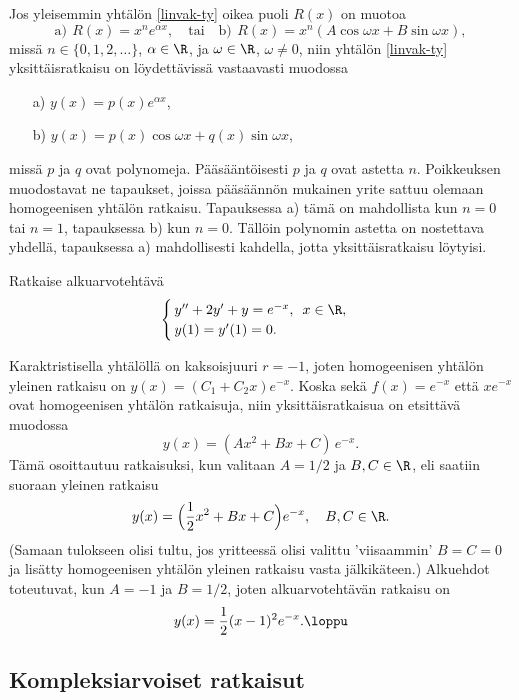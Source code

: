 Jos yleisemmin yhtälön \eqref{linvak-ty} oikea puoli $R(x)$ on muotoa
\[
\text{a)} \ \, R(x)=x^ne^{\alpha x}, \quad \text{tai} \quad 
\text{b)} \ \, R(x)=x^n(A\cos\omega x + B\sin\omega x),
\]
missä $n\in \{0,1,2,\ldots\}$, $\alpha\in\R$, ja $\omega\in\R$, $\omega\neq 0$, niin yhtälön
\eqref{linvak-ty} yksittäisratkaisu on löydettävissä vastaavasti muodossa
\begin{itemize}
\item[a)] $y(x)=p(x)e^{\alpha x}$,
\item[b)] $y(x)=p(x)\cos\omega x+q(x)\sin\omega x$,
\end{itemize}
missä $p$ ja $q$ ovat polynomeja. Pääsääntöisesti $p$ ja $q$ ovat astetta $n$. Poikkeuksen
muodostavat ne tapaukset, joissa pääsäännön mukainen yrite sattuu olemaan homogeenisen yhtälön
ratkaisu. Tapauksessa a) tämä on mahdollista kun $n=0$ tai $n=1$, tapauksessa b) kun $n=0$. 
Tällöin polynomin astetta on nostettava yhdellä, tapauksessa a) mahdollisesti kahdella, jotta
yksittäisratkaisu löytyisi.
\begin{Exa}
Ratkaise alkuarvotehtävä
\[
\begin{cases} \,y''+2y'+y=e^{-x},\,\ x\in\R, \\ \,y(1)=y'(1)=0. \end{cases}
\]
\end{Exa}
\ratk Karaktristisella yhtälöllä on kaksoisjuuri $r=-1$, joten homogeenisen yhtälön yleinen
ratkaisu on $y(x)=(C_1+C_2x)e^{-x}$. Koska sekä $f(x)=e^{-x}$ että $xe^{-x}$ ovat homogeenisen
yhtälön ratkaisuja, niin yksittäisratkaisua on etsittävä muodossa
\[
y(x)=(Ax^2+Bx+C)\,e^{-x}.
\]
Tämä osoittautuu ratkaisuksi, kun valitaan $A=1/2$ ja $B,C\in\R$, eli saatiin suoraan yleinen
ratkaisu
\[
y(x)=\Bigl(\frac{1}{2}x^2+Bx+C\Bigr)e^{-x}, \quad B,C\in\R.
\]
(Samaan tulokseen olisi tultu, jos yritteessä olisi valittu 'viisaammin' $B=C=0$ ja lisätty 
homogeenisen yhtälön yleinen ratkaisu vasta jälkikäteen.) Alkuehdot toteutuvat, kun
$A=-1$ ja $B=1/2$, joten alkuarvotehtävän ratkaisu on
\[
y(x) = \frac{1}{2}(x-1)^2e^{-x}.  \loppu
\]

\subsection{Kompleksiarvoiset ratkaisut}

